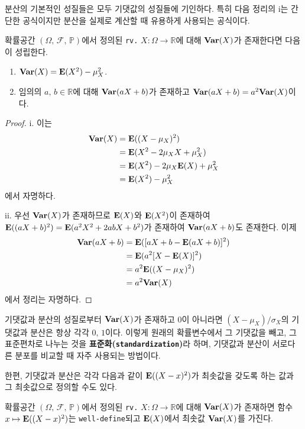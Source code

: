 분산의 기본적인 성질들은 모두 기댓값의 성질들에 기인하다. 특히 다음 정리의 i는 간단한 공식이지만 분산을 실제로 계산할 때 유용하게 사용되는 공식이다.

\begin{theorem}
    확률공간 $(\Omega,\,\mathcal{F},\,\mathbb{P})$에서 정의된 \texttt{rv.} $X:\Omega\to\mathbb{R}$에 대해 $\mathbf{Var}(X)$가 존재한다면 다음이 성립한다.
    \begin{enumerate}
        \item $\mathbf{Var}(X)=\mathbf{E}(X^2)-\mu_X^2$.
        \item 임의의 $a,\,b\in\mathbb{R}$에 대해 $\mathbf{Var}(aX+b)$가 존재하고 $\mathbf{Var}(aX+b)=a^2\mathbf{Var}(X)$이다.
    \end{enumerate}
\end{theorem}

\begin{proof}
    i. 이는
    \begin{align*}
        \mathbf{Var}(X)&=\mathbf{E}((X-\mu_X)^2)\\
        &=\mathbf{E}(X^2-2\mu_XX+\mu_X^2)\\
        &=\mathbf{E}(X^2)-2\mu_X\mathbf{E}(X)+\mu_X^2\\
        &=\mathbf{E}(X^2)-\mu_X^2
    \end{align*}
    에서 자명하다.

    ii. 우선 $\mathbf{Var}(X)$가 존재하므로 $\mathbf{E}(X)$와 $\mathbf{E}(X^2)$이 존재하여 $\mathbf{E}((aX+b)^2)=\mathbf{E}(a^2X^2+2abX+b^2)$가 존재하여 $\mathbf{Var}(aX+b)$도 존재한다. 이제
    \begin{align*}
        \mathbf{Var}(aX+b)&=\mathbf{E}([aX+b-\mathbf{E}(aX+b)]^2)\\
        &=\mathbf{E}(a^2[X-\mathbf{E}(X)]^2)\\
        &=a^2\mathbf{E}((X-\mu_X)^2)\\
        &=a^2\mathbf{Var}(X)
    \end{align*}
   에서 정리는 자명하다.
\end{proof}

기댓값과 분산의 성질로부터 $\mathbf{Var}(X)$가 존재하고 $0$이 아니라면 $(X-\mu_X)/\sigma_X$의 기댓값과 분산은 항상 각각 $0,\,1$이다. 이렇게 원래의 확률변수에서 그 기댓값을 빼고, 그 표준편차로 나누는 것을 \textbf{표준화(\texttt{standardization})}라 하며, 기댓값과 분산이 서로다른 분포를 비교할 때 자주 사용되는 방법이다.

한편, 기댓값과 분산은 각각 다음과 같이 $\mathbf{E}((X-x)^2)$가 최솟값을 갖도록 하는 값과 그 최솟값으로 정의할 수도 있다.

\begin{theorem}
    확률공간 $(\Omega,\,\mathcal{F},\,\mathbb{P})$에서 정의된 \texttt{rv.} $X:\Omega\to\mathbb{R}$에 대해 $\mathbf{Var}(X)$가 존재하면 함수 $x\mapsto\mathbf{E}((X-x)^2)$는 \texttt{well-define}되고 $\mathbf{E}(X)$에서 최솟값 $\mathbf{Var}(X)$를 가진다.
\end{theorem}

